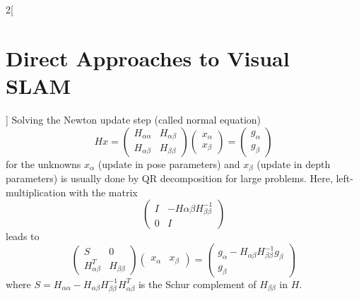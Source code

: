 \documentclass[oneside,fontsize=11pt,paper=a4]{scrartcl}
\begin{document}
\begin{multicols}{2}[\section{Direct Approaches to Visual SLAM}]
Solving the Newton update step (called normal equation)
\begin{equation*}
    H x = \begin{pmatrix}H_{\alpha \alpha} & H_{\alpha \beta}\\ H_{\alpha \beta} & H_{\beta \beta} \end{pmatrix}
    \begin{pmatrix}x_{\alpha} \\ x_{\beta}\end{pmatrix} = \begin{pmatrix}g_{\alpha} \\ g_{\beta}\end{pmatrix}
\end{equation*}
for the unknowns $x_{\alpha}$ (update in pose parameters) and $x_{\beta}$ (update in depth parameters) is usually done by QR decomposition for large problems.
Here, left-multiplication with the matrix
\begin{equation*}
    \begin{pmatrix}I & -H{\alpha \beta} H_{\beta \beta}^{-1}\\ 0 & I \end{pmatrix}
\end{equation*}
leads to
\begin{equation*}
    \begin{pmatrix}S & 0\\H_{\alpha \beta}^T & H_{\beta \beta} \end{pmatrix} \begin{pmatrix}x_{\alpha} & x_{\beta} \end{pmatrix} = \begin{pmatrix}g_{\alpha} - H_{\alpha \beta} H_{\beta \beta}^{-1} g_{\beta}\\ g_{\beta} \end{pmatrix}
\end{equation*}
where $S = H_{\alpha \alpha} - H_{\alpha \beta} H_{\beta \beta}^{-1} H_{\alpha \beta}^T$ is the Schur complement of $H_{\beta \beta}$ in $H$.
\end{multicols}
\end{document}

